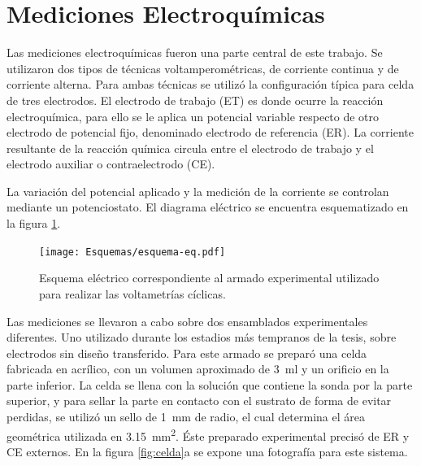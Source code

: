 \section{Mediciones Electroquímicas}\label{sec:medidas_eq}
		
			Las mediciones electroquímicas fueron una parte central de este trabajo. Se utilizaron dos tipos de técnicas voltamperométricas, de corriente continua y de corriente alterna. 	%
			Para ambas técnicas se utilizó la configuración típica para celda de tres electrodos.\cite{Wi2000} El electrodo de trabajo (ET) es donde ocurre la reacción electroquímica, para ello se le aplica un potencial variable respecto de otro electrodo de potencial fijo, denominado electrodo de referencia (ER). La corriente resultante de la reacción química circula entre el electrodo de trabajo y el electrodo auxiliar o contraelectrodo (CE). 
		
			La variación del potencial aplicado y la medición de la corriente se controlan mediante un potenciostato. El diagrama eléctrico se encuentra esquematizado en la figura \ref{fig:eq-circuito}.

				\begin{figure}[h!]
			 		  \begin{center}
			 		  \texttt{[image: Esquemas/esquema-eq.pdf]}
			 		  \caption[Circuito eléctrico EQ]{Esquema eléctrico correspondiente al armado experimental utilizado para realizar las voltametrías cíclicas.}
			 		  \label{fig:eq-circuito}
			 		  \end{center}
			 		  \end{figure}

			Las mediciones se llevaron a cabo sobre dos ensamblados experimentales diferentes. Uno utilizado durante los estadios más tempranos de la tesis, sobre electrodos sin diseño transferido. Para este armado se preparó una celda fabricada en acrílico, con un volumen aproximado de \SI{3}{\ml} y un orificio en la parte inferior. La celda se llena con la solución que contiene la sonda por la parte superior, y para sellar la parte en contacto con el sustrato de forma de evitar perdidas, se utilizó un sello de \SI{1}{\mm} de radio, el cual determina el área geométrica utilizada en \SI{3.15}{\mm^{2}}. Éste preparado experimental precisó de ER y CE externos. En la figura \ref{fig:celda}a se expone una fotografía para este sistema. 

